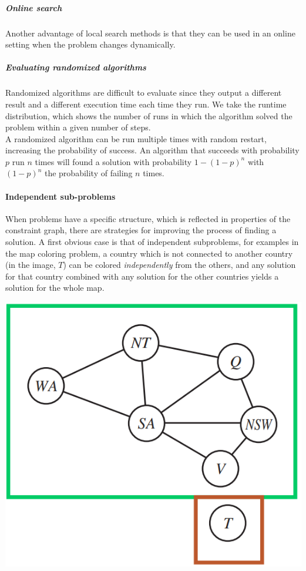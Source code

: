 \documentclass[10pt]{report}
\begin{document}
\subparagraph{Online search} Another advantage of local search methods is that they can be used in an online setting when the problem changes dynamically.
\subparagraph{Evaluating randomized algorithms} Randomized algorithms are difficult to evaluate since they output a different result and a different execution time each time they run. We take the runtime distribution, which shows the number of runs in which the algorithm solved the problem within a given number of steps.\\
A randomized algorithm can be run multiple times with random restart, increasing the probability of success. An algorithm that succeeds with probability $p$ run $n$ times will found a solution with probability $1 - (1-p)^n$ with $(1-p)^n$ the probability of failing $n$ times.
\paragraph{Independent sub-problems} When problems have a specific structure, which is reflected in properties of the constraint graph, there are strategies for improving the process of finding a solution. A first obvious case is that of independent subproblems, for examples in the map coloring problem, a country which is not connected to another country (in the image, $T$) can be colored \textit{independently} from the others, and any solution for that country combined with any solution for the other countries yields a solution for the whole map.
\begin{center}
	\includegraphics[scale=0.75]{8.png}
\end{center}
\end{document}
